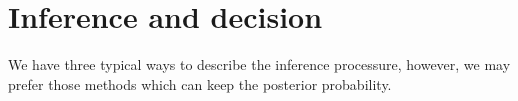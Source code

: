 \documentclass{article}
\begin{document}
\section{Inference and decision}
We have three typical ways to describe the inference processure, however, we may prefer those methods which can keep the posterior probability.







\appendix
\end{document}
